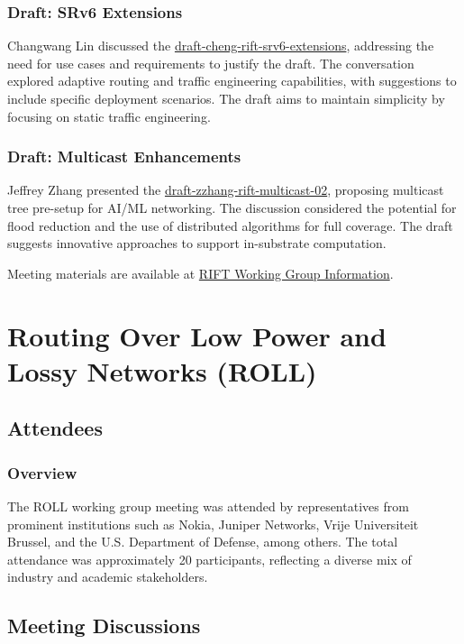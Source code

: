 \documentclass{article}
\begin{document}
\subsubsection{Draft: SRv6 Extensions}
Changwang Lin discussed the \href{https://datatracker.ietf.org/doc/html/draft-ietf-rift-srv6-extensions}{draft-cheng-rift-srv6-extensions}, addressing the need for use cases and requirements to justify the draft. The conversation explored adaptive routing and traffic engineering capabilities, with suggestions to include specific deployment scenarios. The draft aims to maintain simplicity by focusing on static traffic engineering.

\subsubsection{Draft: Multicast Enhancements}
Jeffrey Zhang presented the \href{https://datatracker.ietf.org/doc/html/draft-ietf-rift-multicast-02}{draft-zzhang-rift-multicast-02}, proposing multicast tree pre-setup for AI/ML networking. The discussion considered the potential for flood reduction and the use of distributed algorithms for full coverage. The draft suggests innovative approaches to support in-substrate computation.

Meeting materials are available at \href{https://datatracker.ietf.org/group/rift/about/}{RIFT Working Group Information}.



\newpage

\section{Routing Over Low Power and Lossy Networks (ROLL)}

\subsection{Attendees}
\subsubsection{Overview}
The ROLL working group meeting was attended by representatives from prominent institutions such as Nokia, Juniper Networks, Vrije Universiteit Brussel, and the U.S. Department of Defense, among others. The total attendance was approximately 20 participants, reflecting a diverse mix of industry and academic stakeholders.

\subsection{Meeting Discussions}
\end{document}

